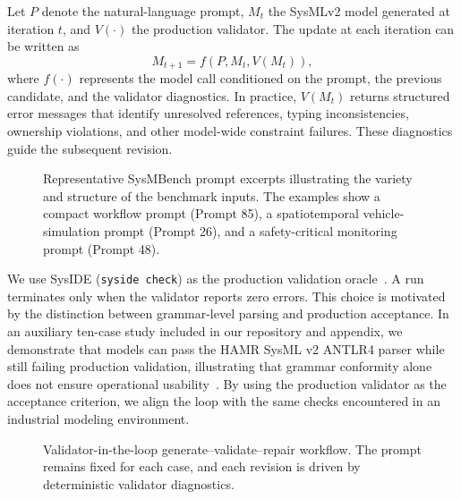Let $P$ denote the natural-language prompt, $M_t$ the SysMLv2 model generated at iteration $t$, and $V(\cdot)$ the production validator. The update at each iteration can be written as
\[
M_{t+1} = f\!\left(P, M_t, V(M_t)\right),
\]
where $f(\cdot)$ represents the model call conditioned on the prompt, the previous candidate, and the validator diagnostics. In practice, $V(M_t)$ returns structured error messages that identify unresolved references, typing inconsistencies, ownership violations, and other model-wide constraint failures. These diagnostics guide the subsequent revision.

\setcounter{figure}{1}
\begin{figure}[!b]
\centering

\caption{Representative SysMBench prompt excerpts illustrating the variety and structure of the benchmark inputs. The examples show a compact workflow prompt (Prompt 85), a spatiotemporal vehicle-simulation prompt (Prompt 26), and a safety-critical monitoring prompt (Prompt 48).}
\label{fig:prompt_showcase}
\end{figure}
\setcounter{figure}{0}



We use SysIDE (\texttt{syside check}) as the production validation oracle~\cite{sensmetry2024syside}. A run terminates only when the validator reports zero errors. This choice is motivated by the distinction between grammar-level parsing and production acceptance. In an auxiliary ten-case study included in our repository and appendix, we demonstrate that models can pass the HAMR SysML v2 ANTLR4 parser while still failing production validation, illustrating that grammar conformity alone does not ensure operational usability~\cite{sysmbenchCompilerLoopRepo2026,hamrSysmlParser2026,sysmlV2PilotImplementation2026}. By using the production validator as the acceptance criterion, we align the loop with the same checks encountered in an industrial modeling environment.

\begin{figure}[H]
\centering
\resizebox{\columnwidth}{!}{}
\caption{Validator-in-the-loop generate--validate--repair workflow. The prompt remains fixed for each case, and each revision is driven by deterministic validator diagnostics.}
\label{fig:gcr_loop_methods}
\end{figure}
\setcounter{figure}{2}



